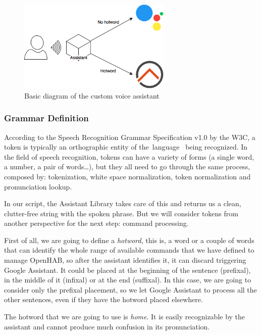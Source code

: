 \begin{figure}
	\centering
	\includegraphics[width=0.65\textwidth]{images/Chapter_06/custom-assistant-simple.png}
	\caption{Basic diagram of the custom voice assistant}
	\label{fig:custom-assistant-simple}
\end{figure}

\subsubsection{Grammar Definition}
According to the Speech Recognition Grammar Specification v1.0 by the W3C, a token is typically an orthographic entity of the language 
being recognized. In the field of speech recognition, tokens can have a variety of forms (a single word, a number, a pair of words…),
but they all need to go through the same process, composed by: tokenization, white space normalization, token normalization and
pronunciation lookup.\cite{w3SpeechGrammar}

In our script, the Assistant Library takes care of this and returns us a clean, clutter-free string with the spoken phrase. But we
will consider tokens from another perspective for the next step: command processing.

First of all, we are going to define a \textit{hotword}, this is, a word or a couple of words that can identify the whole range of
available commands that we have defined to manage OpenHAB, so after the assistant identifies it, it can discard triggering Google
Assistant. It could be placed at the beginning of the sentence (prefixal), in the middle of it (infixal) or at the end (suffixal).
In this case, we are going to consider only the prefixal placement, so we let Google Assistant to process all the other sentences,
even if they have the hotword placed elsewhere.

The hotword that we are going to use is \textit{home}. It is easily recognizable by the assistant and cannot produce much confusion
in its pronunciation.

